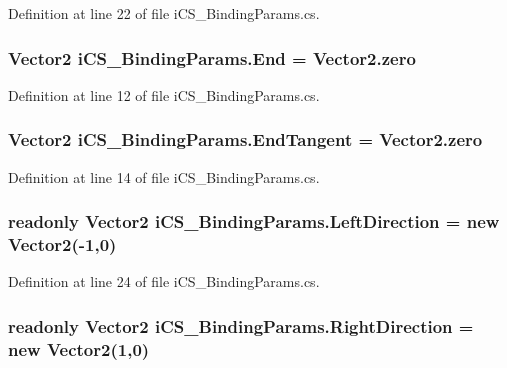 Definition at line 22 of file i\+C\+S\+\_\+\+Binding\+Params.\+cs.

\hypertarget{classi_c_s___binding_params_a5feaf7ce6486eb7ea0b4f49000b76ae4}{
\subsubsection[{End}]{\setlength{\rightskip}{0pt plus 5cm}Vector2 i\+C\+S\+\_\+\+Binding\+Params.\+End = Vector2.\+zero}}\label{classi_c_s___binding_params_a5feaf7ce6486eb7ea0b4f49000b76ae4}


Definition at line 12 of file i\+C\+S\+\_\+\+Binding\+Params.\+cs.

\hypertarget{classi_c_s___binding_params_a7f8cb9188086e21863bf5016c33c13dc}{
\subsubsection[{End\+Tangent}]{\setlength{\rightskip}{0pt plus 5cm}Vector2 i\+C\+S\+\_\+\+Binding\+Params.\+End\+Tangent = Vector2.\+zero}}\label{classi_c_s___binding_params_a7f8cb9188086e21863bf5016c33c13dc}


Definition at line 14 of file i\+C\+S\+\_\+\+Binding\+Params.\+cs.

\hypertarget{classi_c_s___binding_params_afbcc828dd861afeef1f1347894b81b90}{
\subsubsection[{Left\+Direction}]{\setlength{\rightskip}{0pt plus 5cm}readonly Vector2 i\+C\+S\+\_\+\+Binding\+Params.\+Left\+Direction = new Vector2(-\/1,0)\hspace{0.3cm}{\ttfamily [static]}}}\label{classi_c_s___binding_params_afbcc828dd861afeef1f1347894b81b90}


Definition at line 24 of file i\+C\+S\+\_\+\+Binding\+Params.\+cs.

\hypertarget{classi_c_s___binding_params_ad39efe83d365fcebb1447e37513a5ba7}{
\subsubsection[{Right\+Direction}]{\setlength{\rightskip}{0pt plus 5cm}readonly Vector2 i\+C\+S\+\_\+\+Binding\+Params.\+Right\+Direction = new Vector2(1,0)\hspace{0.3cm}{\ttfamily [static]}}}\label{classi_c_s___binding_params_ad39efe83d365fcebb1447e37513a5ba7}


